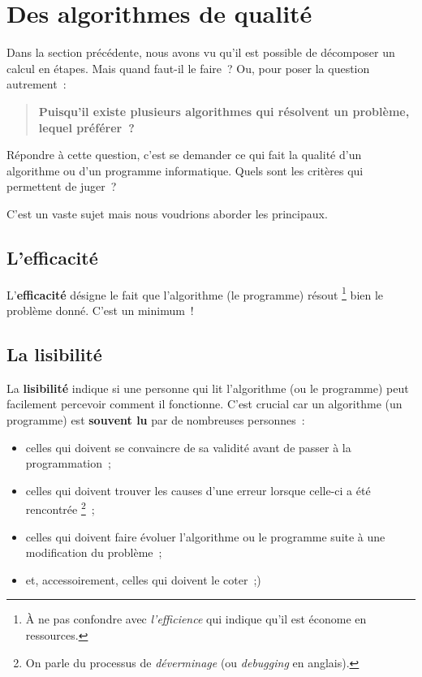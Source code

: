 	\section{Des algorithmes de qualité}
	
		Dans la section précédente,
		nous avons vu qu’il est possible de décomposer un calcul en étapes.
		Mais quand faut-il le faire~?	
		Ou, pour poser la question autrement~:
		
			\begin{quote}
				\textbf{Puisqu’il existe plusieurs algorithmes 
				qui résolvent un problème, lequel préférer~?}
			\end{quote}
		
		Répondre à cette question, 
		c’est se demander ce qui fait la qualité d’un algorithme
		ou d’un programme informatique.
		Quels sont les critères qui permettent de juger~?
		
		C’est un vaste sujet mais nous voudrions aborder les principaux.
		
		\subsection{L’efficacité}
			
			L’\textbf{efficacité}
			désigne le fait que l’algorithme (le programme) résout%
			\footnote{%
				À ne pas confondre avec \emph{l’efficience}
				qui indique qu’il est économe en ressources.
			}
			bien le problème donné.
			C’est un minimum~!
		
		\subsection{La lisibilité}
		
			La \textbf{lisibilité}
			indique si une personne qui lit l’algorithme
			(ou le programme)
			peut facilement percevoir comment il fonctionne.
			C’est crucial car un algorithme (un programme) 
			est \textbf{souvent lu} par de nombreuses personnes~:
			\begin{itemize}
			\item
				celles qui doivent se convaincre de sa validité
				avant de passer à la programmation~;
			\item
				celles qui doivent trouver les causes
				d’une erreur lorsque celle-ci a été rencontrée%
				\footnote{%
					On parle du processus de \emph{déverminage}
					(ou \emph{debugging} en anglais).%
				}~;
			\item
				celles qui doivent faire évoluer l’algorithme
				ou le programme suite à une modification
				du problème~;
			\item
				et, accessoirement, celles qui doivent le coter~;)
			\end{itemize}
			
